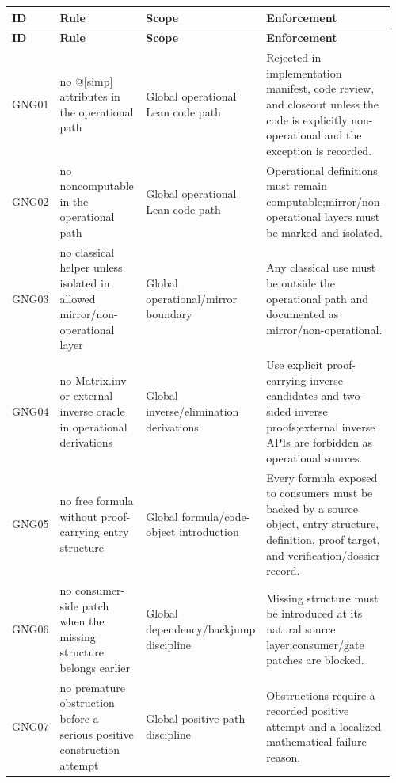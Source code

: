 \small
{}
\begin{longtable}{L{0.045\linewidth} L{0.345\linewidth} L{0.185\linewidth} L{0.39\linewidth}}
\hline
\textbf{ID} & \textbf{Rule} & \textbf{Scope} & \textbf{Enforcement}\\
\hline
\endfirsthead
\hline
\textbf{ID} & \textbf{Rule} & \textbf{Scope} & \textbf{Enforcement}\\
\hline
\endhead
GNG01 & no @[simp] attributes in the operational path & Global operational Lean code path & Rejected in implementation manifest, code review, and closeout unless the code is explicitly non-operational and the exception is recorded.\\
\hline
\addlinespace[0.24em]
GNG02 & no noncomputable in the operational path & Global operational Lean code path & Operational definitions must remain computable;\newline mirror/\allowbreak{}non-operational layers must be marked and isolated.\\
\hline
\addlinespace[0.24em]
GNG03 & no classical helper unless isolated in allowed mirror/\allowbreak{}non-operational layer & Global operational/\allowbreak{}mirror boundary & Any classical use must be outside the operational path and documented as mirror/\allowbreak{}non-operational.\\
\hline
\addlinespace[0.24em]
GNG04 & no Matrix.inv or external inverse oracle in operational derivations & Global inverse/\allowbreak{}elimination derivations & Use explicit proof-carrying inverse candidates and two-sided inverse proofs;\newline external inverse APIs are forbidden as operational sources.\\
\hline
\addlinespace[0.24em]
GNG05 & no free formula without proof-carrying entry structure & Global formula/\allowbreak{}code-object introduction & Every formula exposed to consumers must be backed by a source object, entry structure, definition, proof target, and verification/\allowbreak{}dossier record.\\
\hline
\addlinespace[0.24em]
GNG06 & no consumer-side patch when the missing structure belongs earlier & Global dependency/\allowbreak{}backjump discipline & Missing structure must be introduced at its natural source layer;\newline consumer/\allowbreak{}gate patches are blocked.\\
\hline
\addlinespace[0.24em]
GNG07 & no premature obstruction before a serious positive construction attempt & Global positive-path discipline & Obstructions require a recorded positive attempt and a localized mathematical failure reason.\\

\end{longtable}
